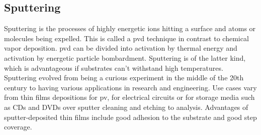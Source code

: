 \subsection{Sputtering}
Sputtering is the processes of highly energetic ions hitting a surface and atoms or molecules being expelled. 
This is called a \gls{pvd} technique in contrast to chemical vapor deposition. 
\Gls{pvd} can be divided into activation by thermal energy and activation by energetic particle bombardment. 
Sputtering is of the latter kind, which 
is advantageous if substrates can't withstand high temperatures.
Sputtering evolved from being a curious experiment in the middle of the 20th century to 
having various applications in research and engineering.
Use cases vary from thin films depositions for \gls{pv}, 
for electrical circuits or for storage media such as CDs and DVDs 
over sputter cleaning and etching to analysis.
Advantages of sputter-deposited thin films include good adhesion to the substrate 
and good step coverage\cite{Swann1988}.

